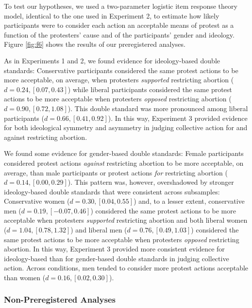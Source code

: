 \documentclass[12pt, letterpaper]{article}
\begin{document}
To test our hypotheses, we used a two-parameter logistic item response
theory model, identical to the one used in Experiment 2, to estimate how
likely participants were to consider each action an acceptable means of
protest as a function of the protesters' cause and of the participants'
gender and ideology. Figure \ref{fig:f6} shows the results of our
preregistered analyses.

As in Experiments 1 and 2, we found evidence for ideology-based double
standards: Conservative participants considered the same protest actions
to be more acceptable, on average, when protesters \emph{supported}
restricting abortion (\(d = 0.24, [0.07, 0.43]\)) while liberal
participants considered the same protest actions to be more acceptable
when protesters \emph{opposed} restricting abortion
(\(d = 0.90, [0.72, 1.08]\)). This double standard was more pronounced
among liberal participants (\(d = 0.66, [0.41, 0.92]\)). In this way,
Experiment 3 provided evidence for both ideological symmetry and
asymmetry in judging collective action for and against restricting
abortion.

We found some evidence for gender-based double standards: Female
participants considered protest actions \emph{against} restricting
abortion to be more acceptable, on average, than male participants or
protest actions \emph{for} restricting abortion
(\(d = 0.14, [0.00, 0.29]\)). This pattern was, however, overshadowed by
stronger ideology-based double standards that were consistent across
subsamples: Conservative women (\(d = 0.30, [0.04, 0.55]\)) and, to a
lesser extent, conservative men (\(d = 0.19, [-0.07, 0.46]\)) considered
the same protest actions to be more acceptable when protesters
\emph{supported} restricting abortion and both liberal women
(\(d = 1.04, [0.78, 1.32]\)) and liberal men
(\(d = 0.76, [0.49, 1.03]\)) considered the same protest actions to be
more acceptable when protesters \emph{opposed} restricting abortion. In
this way, Experiment 3 provided more consistent evidence for
ideology-based than for gender-based double standards in judging
collective action. Across conditions, men tended to consider more
protest actions acceptable than women (\(d = 0.16, [0.02, 0.30]\)).

\hypertarget{non-preregistered-analyses-2}{%
\subsubsection{Non-Preregistered
Analyses}\label{non-preregistered-analyses-2}}
\end{document}
